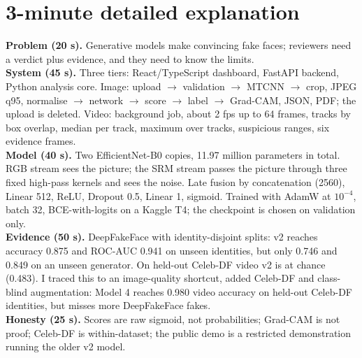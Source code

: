 \documentclass[11pt,a4paper]{report}
\begin{document}
\section{3-minute detailed explanation}
\begin{sayit}
\textbf{Problem (20 s).} Generative models make convincing fake faces; reviewers need a verdict plus evidence, and they need to know the limits.\\
\textbf{System (45 s).} Three tiers: React/TypeScript dashboard, FastAPI backend, Python analysis core. Image: upload $\rightarrow$ validation $\rightarrow$ MTCNN $\rightarrow$ crop, JPEG q95, normalise $\rightarrow$ network $\rightarrow$ score $\rightarrow$ label $\rightarrow$ Grad-CAM, JSON, PDF; the upload is deleted. Video: background job, about 2 fps up to 64 frames, tracks by box overlap, median per track, maximum over tracks, suspicious ranges, six evidence frames.\\
\textbf{Model (40 s).} Two EfficientNet-B0 copies, 11.97 million parameters in total. RGB stream sees the picture; the SRM stream passes the picture through three fixed high-pass kernels and sees the noise. Late fusion by concatenation (2560), Linear 512, ReLU, Dropout 0.5, Linear 1, sigmoid. Trained with AdamW at $10^{-4}$, batch 32, BCE-with-logits on a Kaggle T4; the checkpoint is chosen on validation only.\\
\textbf{Evidence (50 s).} DeepFakeFace with identity-disjoint splits: v2 reaches accuracy 0.875 and ROC-AUC 0.941 on unseen identities, but only 0.746 and 0.849 on an unseen generator. On held-out Celeb-DF video v2 is at chance (0.483). I traced this to an image-quality shortcut, added Celeb-DF and class-blind augmentation: Model 4 reaches 0.980 video accuracy on held-out Celeb-DF identities, but misses more DeepFakeFace fakes.\\
\textbf{Honesty (25 s).} Scores are raw sigmoid, not probabilities; Grad-CAM is not proof; Celeb-DF is within-dataset; the public demo is a restricted demonstration running the older v2 model.
\end{sayit}
\end{document}
